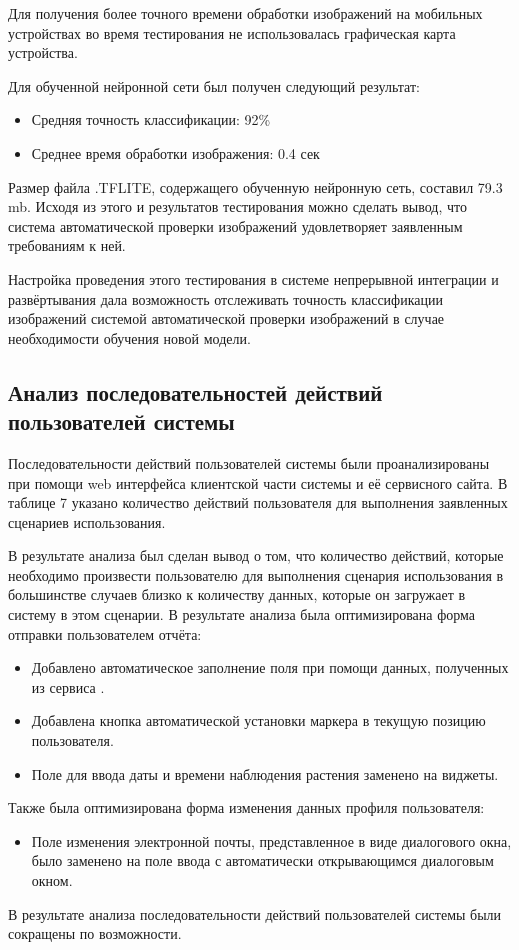 \tab
Для получения более точного времени обработки изображений на мобильных устройствах во время тестирования не использовалась графическая карта устройства.

\tab
Для обученной нейронной сети был получен следующий результат:
\begin{itemize}
	\item Средняя точность классификации: 92\%
	\item Среднее время обработки изображения: 0.4 сек
\end{itemize}

\tab
Размер файла .TFLITE, содержащего обученную нейронную сеть, составил 79.3 mb.
Исходя из этого и результатов тестирования можно сделать вывод, что система автоматической проверки изображений удовлетворяет заявленным требованиям к ней.

\tab
Настройка проведения этого тестирования в системе непрерывной интеграции и развёртывания дала возможность отслеживать точность классификации изображений системой автоматической проверки изображений в случае необходимости обучения новой модели.

\subsection{Анализ последовательностей действий пользователей системы}

\tab
Последовательности действий пользователей системы были проанализированы при помощи web интерфейса клиентской части системы и её сервисного сайта.
В таблице 7 указано количество действий пользователя для выполнения заявленных сценариев использования.
\tableseven

\tab
В результате анализа был сделан вывод о том, что количество действий, которые необходимо произвести пользователю для выполнения сценария использования в большинстве случаев близко к количеству данных, которые он загружает в систему в этом сценарии.
В результате анализа была оптимизирована форма отправки пользователем отчёта:
\begin{itemize}
	\item Добавлено автоматическое заполнение поля  при помощи данных, полученных из сервиса .
	\item Добавлена кнопка автоматической установки маркера в текущую позицию пользователя.
	\item Поле для ввода даты и времени наблюдения растения заменено на виджеты.
\end{itemize}
Также была оптимизирована форма изменения данных профиля пользователя:
\begin{itemize}
	\item Поле изменения электронной почты, представленное в виде диалогового окна, было заменено на поле ввода с автоматически открывающимся диалоговым окном.
\end{itemize}

\tab
В результате анализа последовательности действий пользователей системы были сокращены по возможности.
